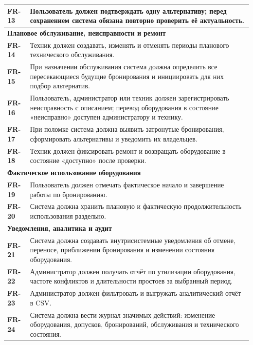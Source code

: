 \documentclass[12pt,a4paper]{article}
\newcommand{\req}[1]{\textbf{#1}}
\begin{document}
\begin{longtable}{|p{}|p{}|}
\hline
\req{FR-13} & Пользователь должен подтверждать одну альтернативу; перед
сохранением система обязана повторно проверить её актуальность. \\
\hline
\multicolumn{2}{|l|}{\textbf{Плановое обслуживание, неисправности и ремонт}} \\
\hline
\req{FR-14} & Техник должен создавать, изменять и отменять периоды планового
технического обслуживания. \\
\hline
\req{FR-15} & При назначении обслуживания система должна определить все
пересекающиеся будущие бронирования и инициировать для них подбор альтернатив. \\
\hline
\req{FR-16} & Пользователь, администратор или техник должен зарегистрировать
неисправность с описанием; перевод оборудования в состояние «неисправно»
доступен администратору и технику. \\
\hline
\req{FR-17} & При поломке система должна выявить затронутые бронирования,
сформировать альтернативы и уведомить их владельцев. \\
\hline
\req{FR-18} & Техник должен фиксировать ремонт и возвращать оборудование в
состояние «доступно» после проверки. \\
\hline
\multicolumn{2}{|l|}{\textbf{Фактическое использование оборудования}} \\
\hline
\req{FR-19} & Пользователь должен отмечать фактическое начало и завершение
работы по бронированию. \\
\hline
\req{FR-20} & Система должна хранить плановую и фактическую продолжительность
использования раздельно. \\
\hline
\multicolumn{2}{|l|}{\textbf{Уведомления, аналитика и аудит}} \\
\hline
\req{FR-21} & Система должна создавать внутрисистемные уведомления об отмене,
переносе, приближении бронирования и изменении состояния оборудования. \\
\hline
\req{FR-22} & Администратор должен получать отчёт по утилизации оборудования,
частоте конфликтов и длительности простоев за выбранный период. \\
\hline
\req{FR-23} & Администратор должен фильтровать и выгружать аналитический отчёт
в CSV. \\
\hline
\req{FR-24} & Система должна вести журнал значимых действий: изменение
оборудования, допусков, бронирований, обслуживания и технического состояния. \\
\hline
\end{longtable}
\end{document}
